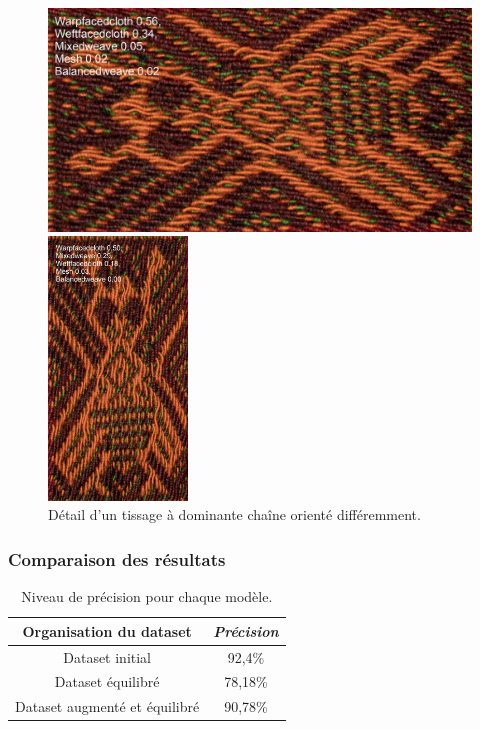 \begin{figure}[!h]
 \begin{minipage}[c]{.5\linewidth}
        \begin{center}
        		\includegraphics[height=5 cm]{../images/B2_Q10.jpg}
	\end{center}
    \end{minipage}
            \begin{minipage}[c]{.5\linewidth}
        \begin{center}
        		\includegraphics[height=7cm]{../images/B2_Q10r.jpg}
	\end{center}
    \end{minipage}
    \caption{Détail d'un tissage à dominante chaîne orienté différemment.}
\end{figure}

\subsubsection{Comparaison des résultats}

\begin{table}[!h]
    \centering
    \begin{tabular}{|c|c|}
        \hline
         \cellcolor{blue!20}\textbf{Organisation du dataset} & \cellcolor{blue!20}\textbf{\textit{Précision}}\\ \hline \hline
          Dataset initial & 92,4\% \\ \hline
          Dataset équilibré & 78,18\%  \\ \hline
          Dataset augmenté et équilibré & 90,78\% \\ \hline
    \end{tabular}
    \caption{Niveau de précision pour chaque modèle.}
    \label{tab:accuracy}
\end{table}

